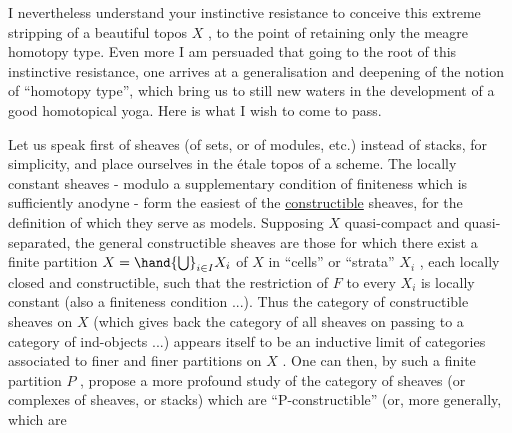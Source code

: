 
I nevertheless understand your instinctive resistance to
conceive this extreme stripping of a beautiful topos $X$ , to the
point of retaining only the meagre homotopy type. Even more I
am persuaded that going to the root of this instinctive resistance,
one arrives at a generalisation and deepening of the notion of
``homotopy type'', which bring us to still new waters in the
development of a good homotopical yoga. Here is what I wish to
come to pass.

Let us speak first of sheaves (of sets, or of modules, etc.)
instead of stacks, for simplicity, and place ourselves in the
étale topos of a scheme. The locally constant sheaves - modulo
a supplementary condition of finiteness which is sufficiently
anodyne - form the easiest of the \uline{constructible} sheaves, for
the definition of which they serve as models. Supposing $X$
quasi-compact and quasi-separated, the general constructible
sheaves are those for which there exist a finite partition
$X = \hand{\bigcup}_{i\in I} X_i$ of $X$ in ``cells'' or ``strata'' $X_i$ , each locally
closed and constructible, such that the restriction of $F$ to
every $X_i$ is locally constant (also a finiteness condition ...).
Thus the category of constructible sheaves on $X$ (which gives
back the category of all sheaves on passing to a category of
ind-objects ...) appears itself to be an inductive limit of
categories associated to finer and finer partitions on $X$ . One
can then, by such a finite partition $P$ , propose a more profound
study of the category of sheaves (or complexes of sheaves, or
stacks) which are ``P-constructible'' (or, more generally, which are

